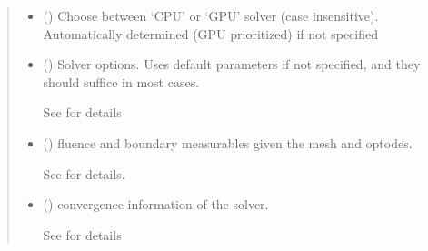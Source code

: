 \documentclass[letterpaper,10pt,english]{sphinxmanual}
\begin{document}
\begin{fulllineitems}
\begin{fulllineitems}
\begin{quote}
\begin{description}
\begin{itemize}
\item {} 
\sphinxAtStartPar
{} (\sphinxstyleliteralemphasis{\sphinxupquote{, }}) \textendash{} Choose between ‘CPU’ or ‘GPU’ solver (case insensitive). Automatically determined (GPU prioritized) if not specified

\item {} 
\sphinxAtStartPar
{} ({\hyperref[\detokenize{_autosummary/nirfasterff.utils.SolverOptions:nirfasterff.utils.SolverOptions}]{}}\sphinxstyleliteralemphasis{\sphinxupquote{, }}) \textendash{} 
\sphinxAtStartPar
Solver options. Uses default parameters if not specified, and they should suffice in most cases.

\sphinxAtStartPar
See {\hyperref[\detokenize{_autosummary/nirfasterff.utils.SolverOptions:nirfasterff.utils.SolverOptions}]{}} for details


\end{itemize}

\sphinxAtStartPar
\begin{itemize}
\item {} 
\sphinxAtStartPar
{} () \textendash{} fluence and boundary measurables given the mesh and optodes.

\sphinxAtStartPar
See {\hyperref[\detokenize{_autosummary/nirfasterff.base.data.FDdata:nirfasterff.base.data.FDdata}]{}} for details.

\item {} 
\sphinxAtStartPar
{} () \textendash{} convergence information of the solver.

\sphinxAtStartPar
See {\hyperref[\detokenize{_autosummary/nirfasterff.utils.ConvergenceInfo:nirfasterff.utils.ConvergenceInfo}]{}} for details

\end{itemize}


\end{description}\end{quote}


\end{fulllineitems}
\end{fulllineitems}
\end{document}
